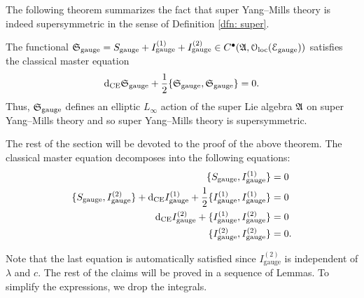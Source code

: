 \documentclass[10pt, oneside]{article}
\newcommand{\gauge}{\mathrm{gauge}}
\begin{document}
The following theorem summarizes the fact that super Yang--Mills theory is indeed supersymmetric in the sense of Definition \ref{dfn: super}. 

\begin{theorem}\label{thm:gaugemultipletSUSY}
The functional $\fS_{\gauge} = S_{\gauge} + I_{\gauge}^{(1)} + I_{\gauge}^{(2)} \in C^\bu(\mf{A}, \oloc(\cE_{\gauge}))$ satisfies the classical master equation
\[\d_{\mr{CE}} \fS_{\gauge} + \frac{1}{2}\{\fS_{\gauge}, \fS_{\gauge}\} = 0.\]
Thus, $\fS_{\gauge}$ defines an elliptic $L_\infty$ action of the super Lie algebra $\mathfrak A$ on super Yang--Mills theory and so super Yang--Mills theory is supersymmetric.  
\end{theorem}

The rest of the section will be devoted to the proof of the above theorem. The classical master equation decomposes into the following equations:
\begin{align*}
\{S_{\gauge}, I_{\gauge}^{(1)}\} &= 0 \\
\{S_{\gauge}, I_{\gauge}^{(2)}\} + \d_{\mr{CE}} I_{\gauge}^{(1)} + \frac{1}{2}\{I_{\gauge}^{(1)}, I_{\gauge}^{(1)}\} &= 0 \\
\d_{\mr{CE}} I_{\gauge}^{(2)} + \{I_{\gauge}^{(1)}, I_{\gauge}^{(2)}\} &= 0 \\
\{I_{\gauge}^{(2)}, I_{\gauge}^{(2)}\} &= 0.
\end{align*}

Note that the last equation is automatically satisfied since $I_{\gauge}^{(2)}$ is independent of $\lambda$ and $c$. The rest of the claims will be proved in a sequence of Lemmas. To simplify the expressions, we drop the integrals.
\end{document}
